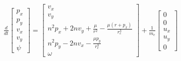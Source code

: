 \documentclass[preview]{standalone}
\begin{document}
\begin{align*}
\frac{d}{dt} \begin{bmatrix} p_x\\ p_y \\  v_x \\ v_y \\ \psi \end{bmatrix} = \begin{bmatrix}v_x \\v_y \\n^2 p_x + 2 n v_y + \frac{\mu}{r^2} - \frac{\mu(r+p_x)}{r_c^3}\\n^2 p_y - 2 n v_x - \frac{\mu p_y} {r_c^3}\\\omega\end{bmatrix} + \frac{1}{m_c}\begin{bmatrix}0 \\ 0 \\ u_x \\ u_y \\ 0\end{bmatrix}
\end{align*}
\end{document}
